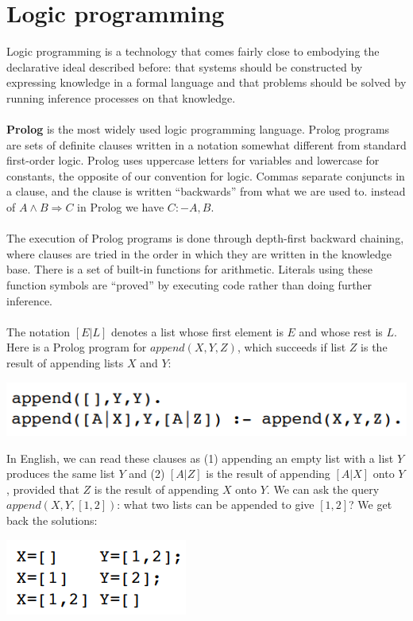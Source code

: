 \section{Logic programming}
Logic programming is a technology that comes fairly close to embodying the declarative ideal described before: that systems should be constructed by expressing knowledge in
a formal language and that problems should be solved by running inference processes on that knowledge.\\\\
\textbf{Prolog} is the most widely used logic programming language. Prolog programs are sets of definite clauses written in a notation somewhat different from standard first-order logic. Prolog uses uppercase letters for variables and lowercase for constants, the opposite of our convention for logic. Commas separate conjuncts in a clause,
and the clause is written “backwards” from what we are used to.  instead of $A \land B \Rightarrow C$ in Prolog we have $C :- A, B$.\\\\
The execution of Prolog programs is done through depth-first backward chaining, where clauses are tried in the order in which they are written in the knowledge base. There is a set of built-in functions for arithmetic. Literals using these function symbols are “proved” by executing code rather than doing further inference.
\\\\
The notation $[E|L]$ denotes a list whose first element is $E$ and whose rest is $L$. Here is a Prolog program for $append(X,Y,Z)$, which succeeds if list $Z$ is the result of appending lists $X$ and $Y$:
\begin{center}
    \includegraphics[]{images/prolog.png}
\end{center}
In English, we can read these clauses as (1) appending an empty list with a list $Y$ produces the same list $Y$ and (2) $[A|Z]$ is the result of appending $[A|X]$ onto $Y$, provided that $Z$ is the result of appending $X$ onto $Y$. We can ask the query $append(X,Y,[1,2])$: what two lists can be appended to give $[1,2]$? We get back the solutions:
\begin{center}
    \includegraphics[]{images/prolog-sol.png}
\end{center}
